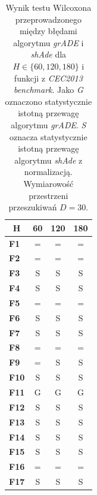 \documentclass[12pt,a4paper]{report}
\begin{document}
{{{{{{{\begin{table}[]
\centering
\caption{Wynik testu Wilcoxona przeprowadzonego między błędami algorytmu \emph{grADE} i \emph{shAde} dla $H \in \{60, 120, 180\}$ i funkcji z \emph{CEC2013 benchmark}. Jako \emph{G} oznaczono statystycznie istotną przewagę algorytmu \emph{grADE}. \emph{S} oznacza statystycznie istotną przewagę algorytmu \emph{shAde} z normalizacją. Wymiarowość przestrzeni przeszukiwań $D = 30$.}
\label{Anal22}
\begin{tabular}{|l|c|c|c|}
\hline
\multicolumn{1}{|c|}{{\bf H}} & {\bf 60} & {\bf 120} & {\bf 180} \\ \hline
{\bf F1}                      & =        & =         & =         \\ \hline
{\bf F2}                      & =        & =         & =         \\ \hline
{\bf F3}                      & S        & S         & S         \\ \hline
{\bf F4}                      & S        & S         & S         \\ \hline
{\bf F5}                      & =        & =         & =         \\ \hline
{\bf F6}                      & S        & S         & S         \\ \hline
{\bf F7}                      & S        & S         & S         \\ \hline
{\bf F8}                      & =        & =         & =         \\ \hline
{\bf F9}                      & =        & S         & S         \\ \hline
{\bf F10}                     & S        & S         & S         \\ \hline
{\bf F11}                     & G        & G         & G         \\ \hline
{\bf F12}                     & S        & S         & S         \\ \hline
{\bf F13}                     & S        & S         & S         \\ \hline
{\bf F14}                     & S        & S         & S         \\ \hline
{\bf F15}                     & S        & S         & S         \\ \hline
{\bf F16}                     & =        & =         & =         \\ \hline
{\bf F17}                     & S        & S         & S         \\ \hline

\end{tabular}
\end{table}}}}}}}}
\end{document}
